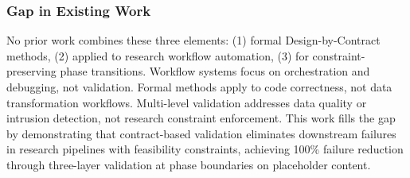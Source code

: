 \subsubsection{Gap in Existing Work}

No prior work combines these three elements: (1) formal Design-by-Contract methods, (2) applied to research workflow automation, (3) for constraint-preserving phase transitions. Workflow systems focus on orchestration and debugging, not validation. Formal methods apply to code correctness, not data transformation workflows. Multi-level validation addresses data quality or intrusion detection, not research constraint enforcement. This work fills the gap by demonstrating that contract-based validation eliminates downstream failures in research pipelines with feasibility constraints, achieving 100\% failure reduction through three-layer validation at phase boundaries on placeholder content.

